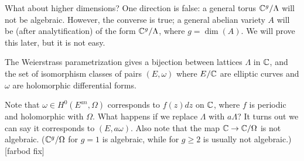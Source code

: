 What about higher dimensions? One direction is false: a general torus ${\mathbb C}^g/\Lambda$ will not be algebraic. However, the converse is true; a general abelian variety $A$ will be (after analytification) of the form ${\mathbb C}^g/\Lambda$, where $g=\dim(A)$. We will prove this later, but it is not easy. 

\begin{theorem}
The Weierstrass parametrization gives a bijection between lattices $\Lambda$ in ${\mathbb C}$, and the set of isomorphism classes of pairs $(E,\omega)$ where $E/{\mathbb C}$ are elliptic curves and $\omega$ are holomorphic differential forms. 
\end{theorem}

Note that $\omega\in H^0(E^{an},\Omega)$ corresponds to $f(z)dz$ on ${\mathbb C}$, where $f$ is periodic and holomorphic with $\Omega$. What happens if we replace $\Lambda$ with $a\Lambda$? It turns out we can say it corresponds to $(E,a\omega)$.
Also note that the map ${\mathbb C}\to {\mathbb C}/\Omega$ is not algebraic. (${\mathbb C}^g/\Omega$ for $g=1$ is algebraic, while for $g\geq 2$ is usually not algebraic.) [farbod fix]